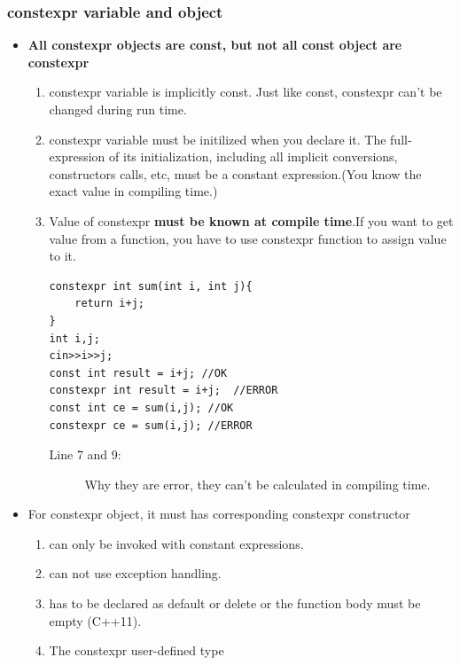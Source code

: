 \documentclass[a4paper,11pt,twoside]{book}
\begin{document}
\subsubsection{constexpr variable and object}
\begin{itemize}
	\item \textbf{All constexpr objects are const, but not all const object are constexpr}
	\begin{enumerate}
		\item constexpr variable is implicitly const. Just like const, constexpr can't be changed during run time.
		
		\item constexpr variable must be initilized when you declare it. The full-expression of its initialization, including all implicit conversions, constructors calls, etc, must be a constant expression.(You know the exact value in compiling time.)
		
		\item Value of constexpr \textbf{must be known at compile time}.If you want to get value from a function, you have to use constexpr function to assign value to it. 
		
\begin{lstlisting}
constexpr int sum(int i, int j){
	return i+j;
}
int i,j;
cin>>i>>j;
const int result = i+j; //OK
constexpr int result = i+j;  //ERROR
const int ce = sum(i,j); //OK
constexpr ce = sum(i,j); //ERROR
\end{lstlisting}
\begin{description}
	\item[Line 7 and 9:] Why they are error, they can't be calculated in compiling time.
\end{description}
		


	\end{enumerate}
	
	\item For constexpr object, it must has corresponding  constexpr constructor 
	\begin{enumerate}
		\item can only be invoked with constant expressions.
		\item can not use exception handling.
		\item has to be declared as default or delete or the function body must be empty (C++11).
		\item The constexpr user-defined type
	\end{enumerate}
	

\end{itemize}
\end{document}
